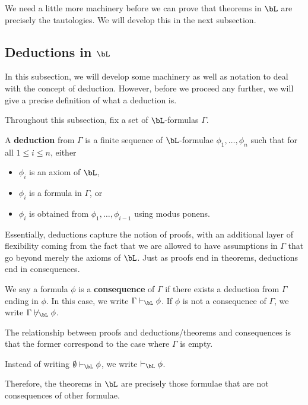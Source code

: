 We need a little more machinery before we can prove that theorems in $\bL$ are precisely the tautologies. We will develop this in the next subsection.

\subsection{Deductions in $\bL$}

In this subsection, we will develop some machinery as well as notation to deal with the concept of deduction. However, before we proceed any further, we will give a precise definition of what a deduction is.

Throughout this subsection, fix a set of $\bL$-formulas $\Gamma$.

\begin{boxdefinition}[Deduction]\label{Ch1:Def:Deduction}
    A \textbf{deduction} from $\Gamma$ is a finite sequence of $\bL$-formulae $\phi_1, \ldots, \phi_n$ such that for all $1 \leq i \leq n$, either
    \begin{itemize}%
        \item $\phi_i$ is an axiom of $\bL$,
        \item $\phi_i$ is a formula in $\Gamma$, or
        \item $\phi_i$ is obtained from $\phi_1, \ldots, \phi_{i-1}$ using modus ponens.
    \end{itemize}
\end{boxdefinition}

Essentially, deductions capture the notion of proofs, with an additional layer of flexibility coming from the fact that we are allowed to have assumptions in $\Gamma$ that go beyond merely the axioms of $\bL$. Just as proofs end in theorems, deductions end in consequences.

\begin{boxdefinition}[Consequence]
    We say a formula $\phi$ is a \textbf{consequence} of $\Gamma$ if there exists a deduction from $\Gamma$ ending in $\phi$. In this case, we write $\Gamma \vdash_{\bL} \phi$. If $\phi$ is not a consequence of $\Gamma$, we write $\Gamma \not\vdash_{\bL} \phi$.
\end{boxdefinition}

The relationship between proofs and deductions/theorems and consequences is that the former correspond to the case where $\Gamma$ is empty.
\begin{boxconvention}
    Instead of writing $\emptyset \vdash_{\bL} \phi$, we write $\vdash_{\bL} \phi$.
\end{boxconvention}
Therefore, the theorems in $\bL$ are precisely those formulae that are not consequences of other formulae.

